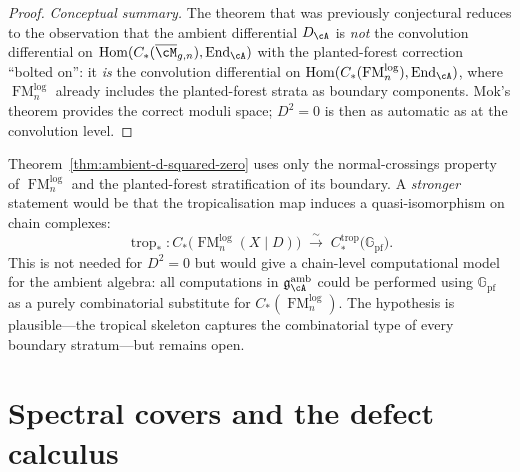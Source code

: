 \begin{proof}
\emph{Conceptual summary.}  The theorem that was previously
conjectural reduces to the observation that the ambient
differential $D_{\cA}$ is \emph{not} the convolution differential
on $\operatorname{Hom}(C_*(\overline{\cM}_{g,n}),
\operatorname{End}_{\cA})$ with the planted-forest correction
``bolted on'': it \emph{is} the convolution differential on
$\operatorname{Hom}(C_*(\operatorname{FM}_n^{\mathrm{log}}),
\operatorname{End}_{\cA})$, where
$\operatorname{FM}_n^{\mathrm{log}}$ already includes the
planted-forest strata as boundary components.  Mok's theorem
\cite[Theorem~3.3.1]{Mok25} provides the correct moduli space;
$D^2 = 0$ is then as automatic as at the convolution level.
\end{proof}

\begin{remark}
\label{hyp:tropical-faithfulness}
\label{rem:tropical-faithfulness}
Theorem~\textup{\ref{thm:ambient-d-squared-zero}} uses only the
normal-crossings property of $\operatorname{FM}_n^{\mathrm{log}}$
and the planted-forest stratification of its boundary.  A
\emph{stronger} statement would be that the tropicalisation map
induces a quasi-isomorphism on chain complexes:
\begin{equation}\label{eq:log-fm-qiso-hypothesis}
\operatorname{trop}_*\colon
C_*\bigl(\operatorname{FM}_n^{\mathrm{log}}(X \mathbin{|} D)\bigr)
\;\xrightarrow{\;\sim\;}\;
C_*^{\mathrm{trop}}\bigl(\mathbb{G}_{\mathrm{pf}}\bigr).
\end{equation}
This is not needed for $D^2 = 0$ but would give a
chain-level computational model for the ambient algebra:
all computations in $\mathfrak{g}^{\mathrm{amb}}_{\cA}$ could
be performed using $\mathbb{G}_{\mathrm{pf}}$ as a purely
combinatorial substitute for $C_*(\operatorname{FM}_n^{\mathrm{log}})$.
The hypothesis is plausible---the tropical skeleton captures
the combinatorial type of every boundary stratum---but remains
open.
\end{remark}


\section{Spectral covers and the defect calculus}
\label{sec:spectral-covers-defect}

